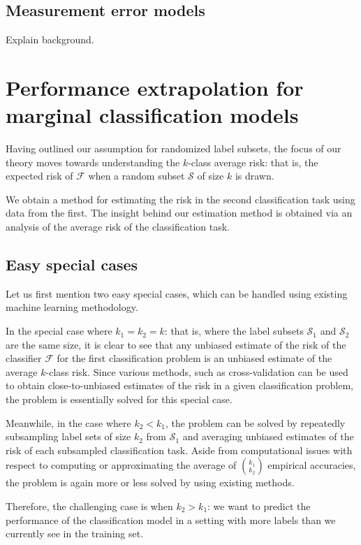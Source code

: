 \documentclass[12pt]{article}
\begin{document}
\subsection{Measurement error models}

Explain background.

\section{Performance extrapolation for marginal classification models}

Having outlined our assumption for randomized label subsets, the focus
of our theory moves towards understanding the $k$-class average risk:
that is, the expected risk of $\mathcal{F}$ when a random subset
$\mathcal{S}$ of size $k$ is drawn.

We obtain a method for estimating the risk in the second
classification task using data from the first.  The insight behind our
estimation method is obtained via an analysis of the average risk of
the classification task.

\subsection{Easy special cases}

Let us first mention two easy special cases, which can be handled
using existing machine learning methodology.

In the special case where $k_1 = k_2 = k$: that is, where the label
subsets $\mathcal{S}_1$ and $\mathcal{S}_2$ are the same size, it is
clear to see that any unbiased estimate of the risk of the classifier
$\mathcal{F}$ for the first classification problem is an unbiased
estimate of the average $k$-class risk.  Since various methods, such
as cross-validation can be used to obtain close-to-unbiased estimates
of the risk in a given classification problem, the problem is
essentially solved for this special case.

Meanwhile, in the case where $k_2 < k_1$, the problem can be solved by
repeatedly subsampling label sets of size $k_2$ from $\mathcal{S}_1$
and averaging unbiased estimates of the risk of each subsampled
classification task.  Aside from computational issues with respect to
computing or approximating the average of ${k_1}\choose{k_2}$
empirical accuracies, the problem is again more or less solved by
using existing methods.

Therefore, the challenging case is when $k_2 > k_1$: we want to
predict the performance of the classification model in a setting with
more labels than we currently see in the training set.
\end{document}
